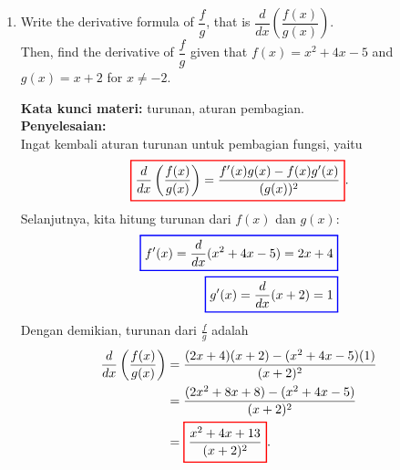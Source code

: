 \documentclass[10pt,openany,a4paper]{article}
\theoremstyle{definition}
\theoremstyle{definition}
\theoremstyle{plain}
\newenvironment{jawab}[2][tes]{%
\par\noindent\textbf{Kata kunci materi:} #1.\\
\textbf{Penyelesaian:} #2%
}{}
\begin{document}
\begin{enumerate}
    \item Write the derivative formula of $\dfrac{f}{g}$, that is $\dfrac{d}{dx}\left(\dfrac{f(x)}{g(x)}\right)$.\\
    Then, find the derivative of $\dfrac{f}{g}$ given that $f(x)=x^2+4x-5$ and $g(x)=x+2$ for $x\neq -2$.
    \begin{jawab}[turunan, aturan pembagian]{~\\
        Ingat kembali aturan turunan untuk pembagian fungsi, yaitu
        \[
        \colorlet{oldcolor}{.}
        \color{red}
        \setlength{\fboxrule}{1pt} \boxed{\color{oldcolor}\frac{d}{dx}\left(\frac{f(x)}{g(x)}\right) = \frac{f'(x)g(x) - f(x)g'(x)}{(g(x))^2}}\color{oldcolor}.
        \]
        Selanjutnya, kita hitung turunan dari \(f(x)\) dan \(g(x)\):
        \begin{align*}
            \colorlet{oldcolor}{.}
        \color{blue}
        \setlength{\fboxrule}{1pt} \boxed{\color{oldcolor}f'(x) = \frac{d}{dx}(x^2 + 4x - 5) = 2x + 4}\color{oldcolor}\\
            \colorlet{oldcolor}{.}
        \color{blue}
        \setlength{\fboxrule}{1pt} \boxed{\color{oldcolor}g'(x) = \frac{d}{dx}(x + 2) = 1}\color{oldcolor}
        \end{align*}
        Dengan demikian, turunan dari \(\frac{f}{g}\) adalah
        \begin{align*}
            \frac{d}{dx}\left(\frac{f(x)}{g(x)}\right) &= \frac{(2x + 4)(x + 2) - (x^2 + 4x - 5)(1)}{(x + 2)^2}\\
            &= \frac{(2x^2 + 8x + 8) - (x^2 + 4x - 5)}{(x + 2)^2}\\
            &= \colorlet{oldcolor}{.}
        \color{red}
        \setlength{\fboxrule}{1pt} \boxed{\color{oldcolor}\frac{x^2 + 4x + 13}{(x + 2)^2}}\color{oldcolor}.
        \end{align*}
    }
    \end{jawab}


\end{enumerate}
\end{document}
